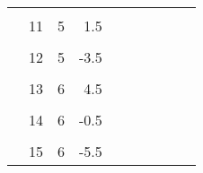 \begin{tabularx}{\textwidth}{| X r r r X | X r r r X |}
&&&&&&&&& \\[-1.1em] &          11 &     5 &  1.5 & & &             &       &      & \\[.2em] \hline
&&&&&&&&& \\[-1.1em] &          12 &     5 & -3.5 & & &             &       &      & \\[.2em] \hline
&&&&&&&&& \\[-1.1em] &          13 &     6 &  4.5 & & &             &       &      & \\[.2em] \hline
&&&&&&&&& \\[-1.1em] &          14 &     6 & -0.5 & & &             &       &      & \\[.2em] \hline
&&&&&&&&& \\[-1.1em] &          15 &     6 & -5.5 & & &             &       &      & \\[.2em] \hline
\end{tabularx}


